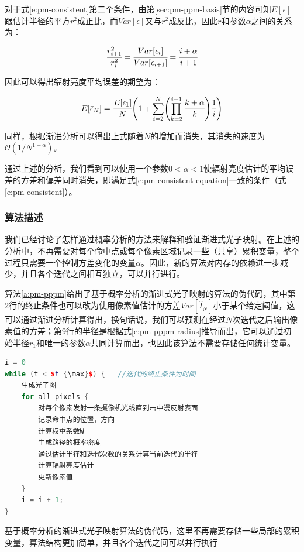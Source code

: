 对于式\ref{e:pm-consistent}第二个条件，由第\ref{sec:pm-ppm-basis}节的内容可知$E[\epsilon]$跟估计半径的平方$r^{2}$成正比，而$Var[\epsilon]$又与$r^{2}$成反比，因此$r$和参数$\alpha$之间的关系为：

\begin{equation}\label{e:pm-pppm-radius}
	 \cfrac{r^{2}_{i+1}}{r^{2}_i}= \cfrac{Var[\epsilon_i]}{Var[\epsilon_{i+1}]}= \cfrac{i+\alpha}{i+1}
\end{equation}

\noindent 因此可以得出辐射亮度平均误差的期望为：

\begin{equation}
	E[\bar{\epsilon}_N]= \cfrac{E[\epsilon_1]}{N}\Biggl( 1+\sum^{N}_{i=2}\Biggl(\prod^{i-1}_{k=2} \cfrac{k+\alpha}{k}\Biggl)  \cfrac{1}{i}\Biggl)
\end{equation}

同样，根据渐进分析可以得出上式随着$N$的增加而消失，其消失的速度为$\mathcal{O}(1/N^{1-\alpha})$。

通过上述的分析，我们看到可以使用一个参数$0<\alpha<1$使辐射亮度估计的平均误差的方差和偏差同时消失，即满足式\ref{e:pm-consistent-equation}一致的条件（式\ref{e:pm-consistent}）。





\subsubsection{算法描述}\label{sec:pm-ppppm-algorithm}
我们已经讨论了怎样通过概率分析的方法来解释和验证渐进式光子映射。在上述的分析中，不再需要对每个命中点或每个像素区域记录一些（共享）累积变量，整个过程只需要一个控制方差变化的变量$\alpha$。因此，新的算法对内存的依赖进一步减少，并且各个迭代之间相互独立，可以并行进行。

算法\ref{a:pm-pppm}给出了基于概率分析的渐进式光子映射的算法的伪代码，其中第2行的终止条件也可以改为使用像素值估计的方差$Var[\hat{I}_N]$小于某个给定阈值，这可以通过渐进分析计算得出，换句话说，我们可以预测在经过$N$次迭代之后输出像素值的方差；第9行的半径是根据式\ref{e:pm-pppm-radius}推导而出，它可以通过初始半径$r_1$和唯一的参数$\alpha$共同计算而出，也因此该算法不需要存储任何统计变量。

\begin{algorithm}
\begin{lstlisting}[language=C++,mathescape]
i = 0
while (t < $t_{\max}$) {   //迭代的终止条件为时间
	生成光子图
	for all pixels {
		对每个像素发射一条摄像机光线直到击中漫反射表面
		记录命中点的位置，方向
		计算权重系数W
		生成路径的概率密度
		通过估计半径和迭代次数的关系计算当前迭代的半径
		计算辐射亮度估计
		更新像素值  
	}
	i = i + 1;
}
\end{lstlisting}	
\caption{基于概率分析的渐进式光子映射算法的伪代码，这里不再需要存储一些局部的累积变量，算法结构更加简单，并且各个迭代之间可以并行执行}
\label{a:pm-pppm}
\end{algorithm}

